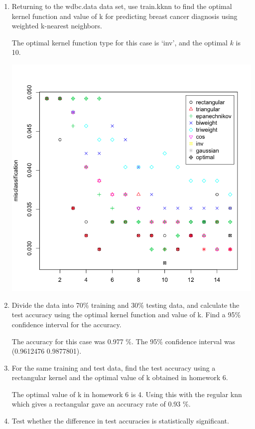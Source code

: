 \documentclass[11pt]{article}
\begin{document}
\begin{enumerate}
  \item 
    Returning to the wdbc.data data set, use train.kknn to find the 
    optimal kernel function and value of k for predicting breast 
    cancer diagnosis using weighted k-nearest neighbors. 

    The optimal kernel function type for this case is `inv', and the 
    optimal $k$ is 10. 

    \begin{center}
    \includegraphics[scale=0.25]{misclass}
    \end{center}
  \item
    Divide the data into 70\% training and 30\% testing data, and 
    calculate the test accuracy using the optimal kernel function 
    and value of k. Find a 95\% confidence interval for the accuracy. 

    The accuracy for this case was 0.977 \%.
    The 95\% confidence interval was (0.9612476 0.9877801).
  \item
    For the same training and test data, find the test accuracy 
    using a rectangular kernel and the optimal value of k obtained 
    in homework 6. 

    The optimal value of k in homework 6 is 4. 
    Using this with the regular knn which gives a rectangular 
    gave an accuracy rate of 0.93 \%.

  \item 
    Test whether the difference in test accuracies is 
    statistically significant. 


\end{enumerate}
\end{document}
